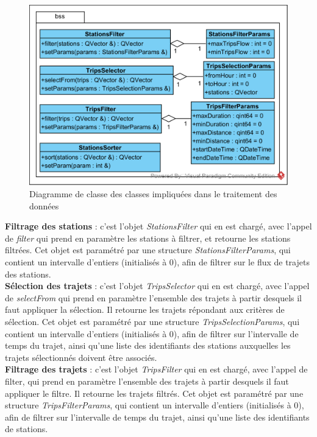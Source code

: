 \documentclass[12pt]{article}
\begin{document}
	\begin{figure}[!h]
	\begin{center}
	\includegraphics[scale=1]{dia_class_filtres.png}
	\caption{Diagramme de classe des classes impliquées dans le traitement des données}
	\end{center}
	\end{figure}
	
	\textbf{Filtrage des stations} : c’est l’objet \textit{StationsFilter} qui en est chargé, avec l’appel de \textit{filter} qui prend en paramètre les stations à filtrer, et retourne les stations filtrées. Cet objet est paramétré par une structure \textit{StationsFilterParams}, qui contient un intervalle d’entiers (initialisés à 0), afin de filtrer sur le flux de trajets des stations.\\

	\textbf{Sélection des trajets} : c’est l’objet \textit{TripsSelector} qui en est chargé, avec l’appel de \textit{selectFrom} qui prend en paramètre l’ensemble des trajets à partir desquels il faut appliquer la sélection. Il retourne les trajets répondant aux critères de sélection. Cet objet est paramétré par une structure \textit{TripsSelectionParams}, qui contient un intervalle d’entiers (initialisés à 0), afin de filtrer sur l’intervalle de temps du trajet, ainsi qu’une liste des identifiants des stations auxquelles les trajets sélectionnés doivent être associés.\\

	\textbf{Filtrage des trajets} : c’est l’objet \textit{TripsFilter} qui en est chargé, avec l’appel de filter, qui prend en paramètre l’ensemble des trajets à partir desquels il faut appliquer le filtre. Il retourne les trajets filtrés. Cet objet est paramétré par une structure \textit{TripsFilterParams}, qui contient un intervalle d’entiers (initialisés à 0), afin de filtrer sur l’intervalle de temps du trajet, ainsi qu’une liste des identifiants de stations.\\
\end{document}
